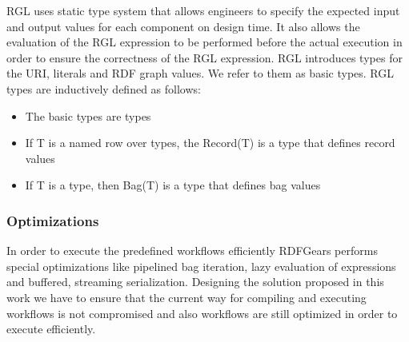RGL uses static type system that allows engineers to specify the expected input and output values for each component on design time. It also allows the evaluation of the RGL expression to be performed before the actual execution in order to ensure the correctness of the RGL expression. RGL introduces types for the URI, literals and RDF graph values. We refer to them as basic types. RGL types are inductively defined as follows:

\begin{itemize}
	\item The basic types are types
	\item If T is a named row over types, the Record(T) is a type that defines record values
	\item If T is a type, then Bag(T) is a type that defines bag values
\end{itemize}

\subsubsection{Optimizations}

In order to execute the predefined workflows efficiently RDFGears performs special optimizations like pipelined bag iteration, lazy evaluation of expressions and buffered, streaming serialization. Designing the solution proposed in this work we have to ensure that the current way for compiling and executing workflows is not compromised and also workflows are still optimized in order to execute efficiently. 

